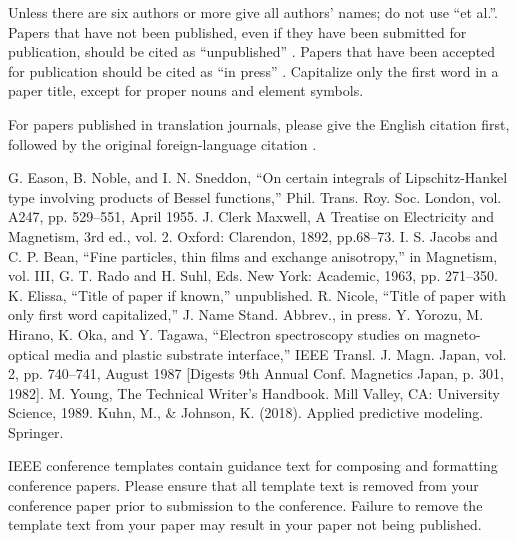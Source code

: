 \documentclass[conference]{IEEEtran}
\begin{document}
Unless there are six authors or more give all authors' names; do not use 
``et al.''. Papers that have not been published, even if they have been 
submitted for publication, should be cited as ``unpublished'' \cite{b4}. Papers 
that have been accepted for publication should be cited as ``in press'' \cite{b5}. 
Capitalize only the first word in a paper title, except for proper nouns and 
element symbols.

For papers published in translation journals, please give the English 
citation first, followed by the original foreign-language citation \cite{b6}.

\begin{thebibliography}{00}
 G. Eason, B. Noble, and I. N. Sneddon, ``On certain integrals of Lipschitz-Hankel type involving products of Bessel functions,'' Phil. Trans. Roy. Soc. London, vol. A247, pp. 529--551, April 1955.
 J. Clerk Maxwell, A Treatise on Electricity and Magnetism, 3rd ed., vol. 2. Oxford: Clarendon, 1892, pp.68--73.
 I. S. Jacobs and C. P. Bean, ``Fine particles, thin films and exchange anisotropy,'' in Magnetism, vol. III, G. T. Rado and H. Suhl, Eds. New York: Academic, 1963, pp. 271--350.
 K. Elissa, ``Title of paper if known,'' unpublished.
 R. Nicole, ``Title of paper with only first word capitalized,'' J. Name Stand. Abbrev., in press.
 Y. Yorozu, M. Hirano, K. Oka, and Y. Tagawa, ``Electron spectroscopy studies on magneto-optical media and plastic substrate interface,'' IEEE Transl. J. Magn. Japan, vol. 2, pp. 740--741, August 1987 [Digests 9th Annual Conf. Magnetics Japan, p. 301, 1982].
 M. Young, The Technical Writer's Handbook. Mill Valley, CA: University Science, 1989.
 Kuhn, M., \& Johnson, K. (2018). Applied predictive modeling. Springer.
\end{thebibliography}
\vspace{12pt}
\color{red}
IEEE conference templates contain guidance text for composing and formatting conference papers. Please ensure that all template text is removed from your conference paper prior to submission to the conference. Failure to remove the template text from your paper may result in your paper not being published.
\end{document}
